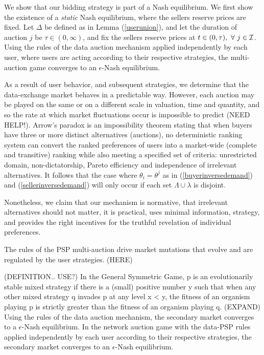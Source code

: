We show that our bidding strategy is
part of a Nash equilibrium. We first show the existence of a \emph{static} Nash
equilibrium, where the sellers reserve prices are fixed.
{
Let $\Delta$ be defined as in Lemma (\ref{userunion}), and
let the duration of auction $j$ be $\tau \in (0,\infty)$, and fix the
sellers reserve prices at $t\in(0,\tau), \ \forall \ j\in\mathcal{I}$.
Using the rules of the data auction mechanism applied independently by each
user, where users are acting according to their respective strategies, the multi-auction game converges to an $\epsilon$-Nash equilibrium. 
}\\

As a result of user behavior, and subsequent strategies, we determine that the
data-exchange market behaves in a predictable way. However,
each auction may be played on the same or on a different scale in
valuation, time and quantity, and so the rate at which market fluctuations occur is
impossible to predict (NEED HELP!). 
Arrow's paradox is an impossibility theorem stating that when buyers have three
or more distinct alternatives (auctions), no deterministic ranking system can
convert the ranked preferences of users into a market-wide (complete
and transitive) ranking while also meeting a specified set of criteria:
unrestricted domain, non-dictatorship, Pareto efficiency and independence of
irrelevant alternatives. It follows that the case where
$\theta_i = \theta^j$ as in (\ref{buyerinversedemand}) and
(\ref{sellerinversedemand}) will only occur if each set $\Lambda \cup \lambda$
is disjoint.

Nonetheless, we claim that our mechanism is normative, that irrelevant
alternatives should not matter, it is practical, uses minimal information,
strategy, and provides the right incentives for the truthful revelation of individual preferences. 

The rules of the PSP
multi-auction drive market mutations that evolve and are regulated by the user
strategies.
(HERE)

(DEFINITION.. USE?)
In the General Symmetric Game, p is an evolutionarily stable mixed strategy if
there is a (small) positive number y such that when any other mixed strategy q
invades p at any level x < y, the fitness of an organism playing p is strictly
greater than the fitness of an organism playing q.
(EXPAND)
{
Using the rules of the data auction mechanism, the secondary market
converges to a $\epsilon$-Nash equilibrium. In the network auction
game with the data-PSP rules applied independently by each user according to their respective strategies, the secondary market converges to an $\epsilon$-Nash
equilibrium. 
}\\


